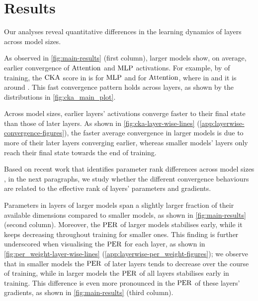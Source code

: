 \section{Results}
\label{sec:tending-towards-stability-results}

Our analyses reveal quantitative differences in the learning dynamics of layers across model sizes.


\begin{result}
\label{result:cka}
As observed in \cref{fig:main-results} (first column), larger models show, on average, earlier convergence of $\mathrm{Attention}$ and $\mathrm{MLP}$ activations. For example, by  of training, the $\mathrm{CKA}$ score in \twobil is  for $\mathrm{MLP}$ and  for $\mathrm{Attention}$, where in \sevenmil and \sixmil it is around .
This fast convergence pattern holds across layers, as shown by the distributions in \cref{fig:cka_main_plot}.
\end{result}

\begin{result}
Across model sizes, earlier layers' activations converge faster to their final state than those of later layers. As shown in \cref{fig:cka-layer-wise-lines} (\cref{app:layerwise-convergence-figures}), the faster average convergence in larger models is due to more of their later layers converging earlier, whereas smaller models' layers only reach their final state towards the end of training.
\end{result}

\vspace{9pt}
Based on recent work that identifies parameter rank differences across model sizes \citep{godey2024small}, in the next paragraphs, we study whether the different convergence behaviours are related to the effective rank of layers' parameters and gradients.
\vspace{9pt}

\begin{result} 
\label{result:weight-effective-rank} 
Parameters in layers of larger models span a slightly larger fraction of their available dimensions compared to smaller models, as shown in \cref{fig:main-results} (second column). 
Moreover, the $\mathrm{PER}$ of larger models stabilises early, while it keeps decreasing throughout training for smaller ones. This finding is further underscored when visualising the $\mathrm{PER}$ for each layer, as shown in \cref{fig:per_weight-layer-wise-lines} (\cref{app:layerwise-per_weight-figures}); we observe that in smaller models the $\mathrm{PER}$ of later layers tends to decrease over the course of training, while in larger models the $\mathrm{PER}$ of all layers stabilises early in training. This difference is even more pronounced in the $\mathrm{PER}$ of these layers' gradients, as shown in \cref{fig:main-results} (third column).
\end{result}

